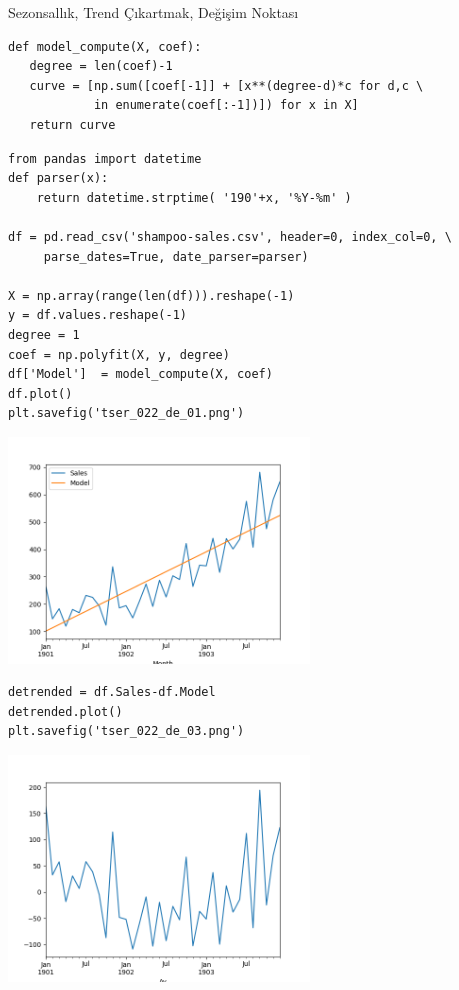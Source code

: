 \documentclass[12pt,fleqn]{article}\usepackage{../../common}
\begin{document}
Sezonsallık, Trend Çıkartmak, Değişim Noktası



\begin{verbatim}
def model_compute(X, coef):
   degree = len(coef)-1
   curve = [np.sum([coef[-1]] + [x**(degree-d)*c for d,c \
            in enumerate(coef[:-1])]) for x in X]
   return curve
\end{verbatim}


\begin{verbatim}
from pandas import datetime
def parser(x):
    return datetime.strptime( '190'+x, '%Y-%m' )
    
df = pd.read_csv('shampoo-sales.csv', header=0, index_col=0, \
     parse_dates=True, date_parser=parser)

X = np.array(range(len(df))).reshape(-1)
y = df.values.reshape(-1)
degree = 1
coef = np.polyfit(X, y, degree)
df['Model']  = model_compute(X, coef)
df.plot()
plt.savefig('tser_022_de_01.png')
\end{verbatim}

\includegraphics[height=6cm]{tser_022_de_01.png}


\begin{verbatim}
detrended = df.Sales-df.Model
detrended.plot()
plt.savefig('tser_022_de_03.png')
\end{verbatim}

\includegraphics[height=6cm]{tser_022_de_03.png}
\end{document}
